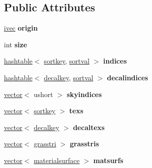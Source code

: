 \subsection*{Public Attributes}
\begin{DoxyCompactItemize}
\item 
\mbox{\label{structvacollect_af1b41ad9aa7892e2fe940f6cca891e1c}} 
\hyperlink{structivec}{ivec} {\bfseries origin}
\item 
\mbox{\label{structvacollect_aae0356a756ef2b1b203ac6bee24d6671}} 
int {\bfseries size}
\item 
\mbox{\label{structvacollect_a672380b77595064e370c79df90d6b566}} 
\hyperlink{structhashtable}{hashtable}$<$ \hyperlink{structsortkey}{sortkey}, \hyperlink{structsortval}{sortval} $>$ {\bfseries indices}
\item 
\mbox{\label{structvacollect_a83b3023f04e4b611ab5a158bcad3332e}} 
\hyperlink{structhashtable}{hashtable}$<$ \hyperlink{structdecalkey}{decalkey}, \hyperlink{structsortval}{sortval} $>$ {\bfseries decalindices}
\item 
\mbox{\label{structvacollect_a5114b54b0216abf282aa0add938bd937}} 
\hyperlink{structvector}{vector}$<$ ushort $>$ {\bfseries skyindices}
\item 
\mbox{\label{structvacollect_a9655b0c1f4b9b668f8d57c0414ee8e14}} 
\hyperlink{structvector}{vector}$<$ \hyperlink{structsortkey}{sortkey} $>$ {\bfseries texs}
\item 
\mbox{\label{structvacollect_a00cf456a8bfe5017f756bce13ad19411}} 
\hyperlink{structvector}{vector}$<$ \hyperlink{structdecalkey}{decalkey} $>$ {\bfseries decaltexs}
\item 
\mbox{\label{structvacollect_a87aff202b1323c30e885a8a20810d7d7}} 
\hyperlink{structvector}{vector}$<$ \hyperlink{structgrasstri}{grasstri} $>$ {\bfseries grasstris}
\item 
\mbox{\label{structvacollect_a2a5b7831b6a2d5948601abbf1b03b936}} 
\hyperlink{structvector}{vector}$<$ \hyperlink{structmaterialsurface}{materialsurface} $>$ {\bfseries matsurfs}

\end{DoxyCompactItemize}
